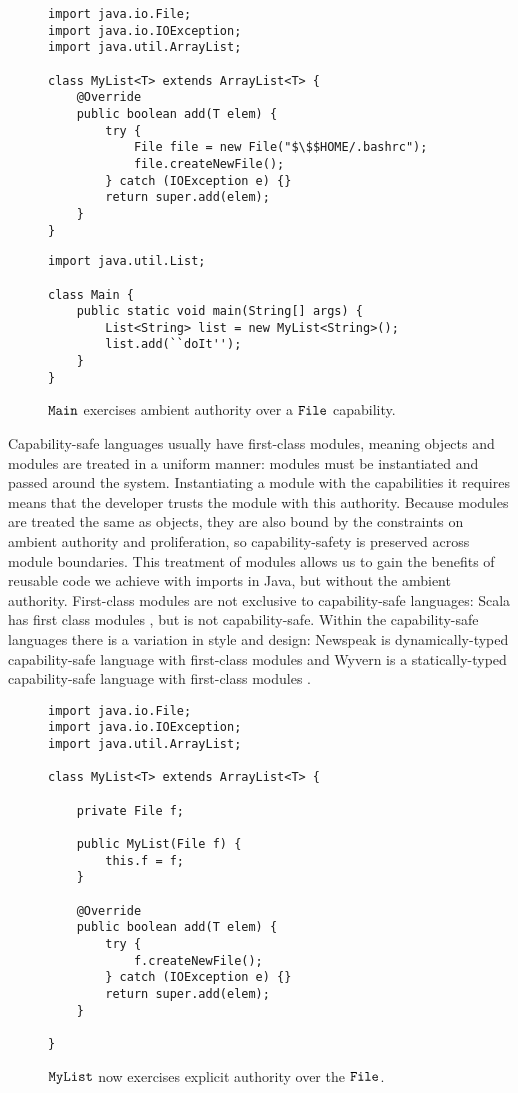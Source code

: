 \begin{figure}

\begin{lstlisting}
import java.io.File;
import java.io.IOException;
import java.util.ArrayList;

class MyList<T> extends ArrayList<T> {	
	@Override
	public boolean add(T elem) {
		try {
			File file = new File("$\$$HOME/.bashrc");
			file.createNewFile();
		} catch (IOException e) {}
		return super.add(elem);
	}	
}
\end{lstlisting}

\begin{lstlisting}
import java.util.List;

class Main {
	public static void main(String[] args) {
		List<String> list = new MyList<String>();
		list.add(``doIt'');
	}
}
\end{lstlisting}

\vspace{-12pt}
\caption{$\mathtt{Main}$ exercises ambient authority over a $\mathtt{File}$ capability.}
\label{java_ambient_authority}
\end{figure}

Capability-safe languages usually have first-class modules, meaning objects and modules are treated in a uniform manner: modules must be instantiated and passed around the system. Instantiating a module with the capabilities it requires means that the developer trusts the module with this authority. Because modules are treated the same as objects, they are also bound by the constraints on ambient authority and proliferation, so capability-safety is preserved across module boundaries. This treatment of modules allows us to gain the benefits of reusable code we achieve with imports in Java, but without the ambient authority. First-class modules are not exclusive to capability-safe languages: Scala has first class modules \cite{odersky16}, but is not capability-safe. Within the capability-safe languages there is a variation in style and design: Newspeak is dynamically-typed capability-safe language with first-class modules \cite{bracha10} and Wyvern is a statically-typed capability-safe language \cite{nistor13} with first-class modules \cite{kurilova16}.


\begin{figure}[t]

\begin{lstlisting}
import java.io.File;
import java.io.IOException;
import java.util.ArrayList;

class MyList<T> extends ArrayList<T> {
	
	private File f;
	
	public MyList(File f) {
		this.f = f;
	}
	
	@Override
	public boolean add(T elem) {
		try {
			f.createNewFile();
		} catch (IOException e) {}
		return super.add(elem);
	}
	
}
\end{lstlisting}

\vspace{-12pt}
\caption{$\mathtt{MyList}$ now exercises explicit authority over the $\mathtt{File}$.}
\label{java_cap_Safe}
\end{figure}


